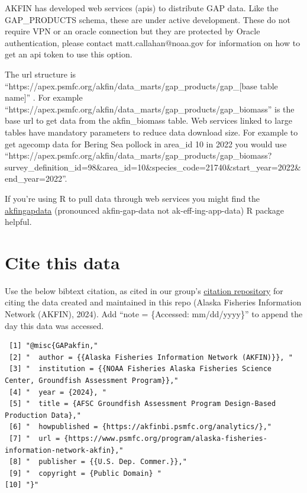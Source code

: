 \documentclass[
  letterpaper,
  oneside,
  open=any]{scrbook}
\begin{document}

AKFIN has developed web services (apis) to distribute GAP data. Like the
GAP\_PRODUCTS schema, these are under active development. These do not
require VPN or an oracle connection but they are protected by Oracle
authentication, please contact matt.callahan@noaa.gov for information on
how to get an api token to use this option.

The url structure is
``https://apex.psmfc.org/akfin/data\_marts/gap\_products/gap\_{[}base
table name{]}'' . For example
``https://apex.psmfc.org/akfin/data\_marts/gap\_products/gap\_biomass''
is the base url to get data from the akfin\_biomass table. Web services
linked to large tables have mandatory parameters to reduce data download
size. For example to get agecomp data for Bering Sea pollock in area\_id
10 in 2022 you would use
``https://apex.psmfc.org/akfin/data\_marts/gap\_products/gap\_biomass?survey\_definition\_id=98\&area\_id=10\&species\_code=21740\&start\_year=2022\&end\_year=2022''.

If you're using R to pull data through web services you might find the
\href{https://github.com/MattCallahan-NOAA/akfingapdata/tree/main}{akfingapdata}
(pronounced akfin-gap-data not ak-eff-ing-app-data) R package helpful.

\section*{Cite this data}\label{cite-this-data-2}


Use the below bibtext citation, as cited in our group's
\href{https://github.com/afsc-gap-products/citations/blob/main/cite/bibliography.bib}{citation
repository} for citing the data created and maintained in this repo
(Alaska Fisheries Information Network (AKFIN), 2024). Add ``note =
\{Accessed: mm/dd/yyyy\}'' to append the day this data was accessed.

\begin{verbatim}
 [1] "@misc{GAPakfin,"                                                                                   
 [2] "  author = {{Alaska Fisheries Information Network (AKFIN)}}, "                                     
 [3] "  institution = {{NOAA Fisheries Alaska Fisheries Science Center, Groundfish Assessment Program}},"
 [4] "  year = {2024}, "                                                                                 
 [5] "  title = {AFSC Groundfish Assessment Program Design-Based Production Data},"                      
 [6] "  howpublished = {https://akfinbi.psmfc.org/analytics/},"                                          
 [7] "  url = {https://www.psmfc.org/program/alaska-fisheries-information-network-akfin},"               
 [8] "  publisher = {{U.S. Dep. Commer.}},"                                                              
 [9] "  copyright = {Public Domain} "                                                                    
[10] "}"                                                                                                 
\end{verbatim}
\end{document}

